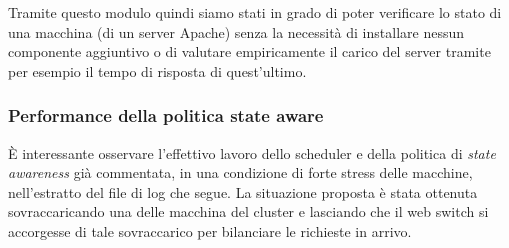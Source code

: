 \documentclass[italian]{tktltiki2}
\begin{document}
Tramite questo modulo quindi siamo stati in grado di poter verificare lo stato di una macchina (di un server Apache) senza la necessità di installare nessun componente aggiuntivo o di valutare empiricamente il carico del server tramite per esempio il tempo di risposta di quest'ultimo.

\subsubsection{Performance della politica state aware}
È interessante osservare l'effettivo lavoro dello scheduler e della politica di \emph{state awareness} già commentata, in una condizione di forte stress delle macchine, nell'estratto del file di log che segue. La situazione proposta è stata ottenuta sovraccaricando una delle macchina del cluster e lasciando che il web switch si accorgesse di tale sovraccarico per bilanciare le richieste in arrivo.
\end{document}
